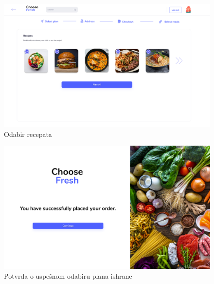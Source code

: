 \begin{figure}[H]
	\begin{center}
		\includegraphics[width=\textwidth]{UI/Select Meal Plan (Screen 4).png}
    		\caption{Odabir recepata}
    \label{fig:SelectMealPlanScreen4}
    \end{center}
\end{figure}

\begin{figure}[H]
	\begin{center}
		\includegraphics[width=\textwidth]{UI/Select Meal Plan (Screen 5).png}
    		\caption{Potvrda o uspešnom odabiru plana ishrane}
    \label{fig:SelectMealPlanScreen5}
    \end{center}
\end{figure}
